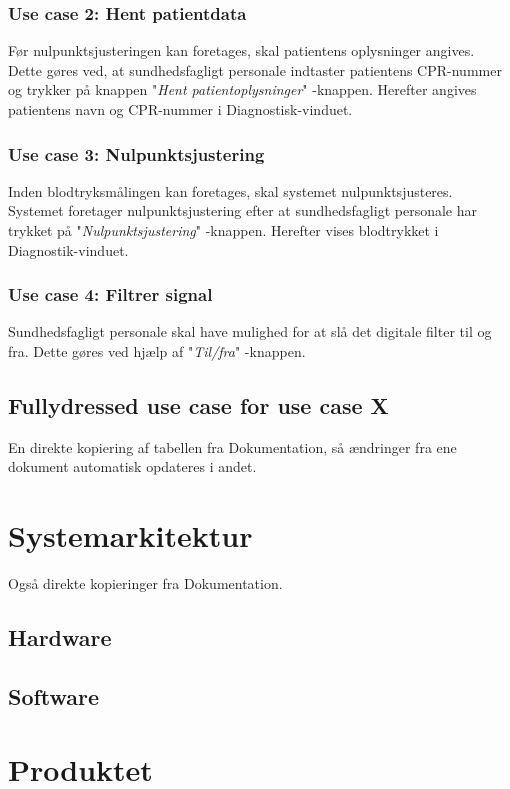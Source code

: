 \subsubsection{Use case 2: Hent patientdata}
Før nulpunktsjusteringen kan foretages, skal patientens oplysninger angives. Dette gøres ved, at sundhedsfagligt personale indtaster patientens CPR-nummer og trykker på knappen "\textit{Hent patientoplysninger}"\- -knappen. Herefter angives patientens navn og CPR-nummer i Diagnostisk-vinduet. 

\subsubsection{Use case 3: Nulpunktsjustering}
Inden blodtryksmålingen kan foretages, skal systemet nulpunktsjusteres. Systemet foretager nulpunktsjustering efter at sundhedsfagligt personale har trykket på "\textit{Nulpunktsjustering}"\- -knappen. Herefter vises blodtrykket i Diagnostik-vinduet.

\subsubsection{Use case 4: Filtrer signal}
Sundhedsfagligt personale skal have mulighed for at slå det digitale filter til og fra. Dette gøres ved hjælp af "\textit{Til/fra}"\- -knappen.

\subsection{Fullydressed use case for use case X}
En direkte kopiering af tabellen fra Dokumentation, så ændringer fra ene dokument automatisk opdateres i andet.


\section{Systemarkitektur}
Også direkte kopieringer fra Dokumentation.

\subsection{Hardware}

\subsection{Software}


\section{Produktet}

